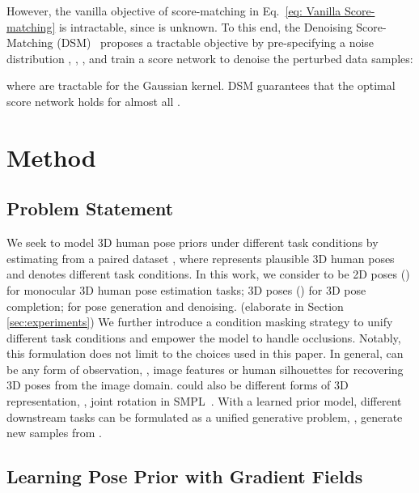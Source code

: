 \documentclass[10pt,twocolumn,letterpaper]{article}
\begin{document}
However, the vanilla objective of score-matching in Eq.~\ref{eq: Vanilla Score-matching} is intractable, since  is unknown. To this end, the Denoising Score-Matching (DSM)~\cite{denosingScoreMatching} proposes a tractable objective by pre-specifying a noise distribution , \eg, , and train a score network to denoise the perturbed data samples:

where  are tractable for the Gaussian kernel. DSM guarantees that the optimal score network holds  for almost all .







 

\section{Method}
\label{sec:method}
\subsection{Problem Statement}
\label{sec:problem statement}

We seek to model 3D human pose priors under different task conditions  by estimating  from a paired dataset , where  represents plausible 3D human poses and  denotes different task conditions. In this work, we consider  to be 2D poses () for monocular 3D human pose estimation tasks; 3D poses () for 3D pose completion;  for pose generation and denoising. (elaborate in Section \ref{sec:experiments}) We further introduce a condition masking strategy to unify different task conditions and empower the model to handle occlusions.
Notably, this formulation does not limit to the choices used in this paper. In general,  can be any form of observation, \eg, image features or human silhouettes for recovering 3D poses from the image domain.  could also be different forms of 3D representation, \eg, joint rotation in SMPL~\cite{loper2015smpl}. With a learned prior model, different downstream tasks can be formulated as a unified generative problem, \ie, generate new samples from .









\subsection{Learning Pose Prior with Gradient Fields}
\label{sec:learn_gf}
\end{document}
